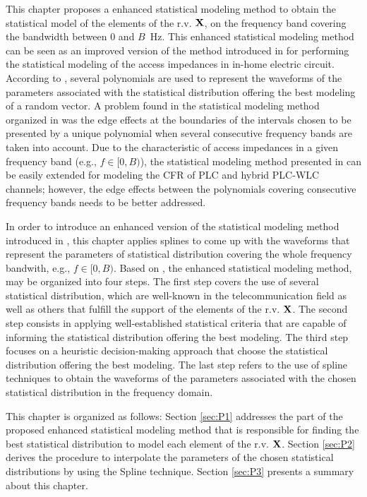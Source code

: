 This chapter proposes a enhanced statistical modeling method to obtain the statistical model of the elements of the \ac{r.v.} $\bf X$, on the frequency band covering the bandwidth between $0$ and $B$~Hz. This enhanced statistical modeling method can be seen as an improved version of the method introduced in \cite{Luis:AI,Luis:doc} for performing the statistical modeling of the access impedances in in-home electric circuit. According to \cite{Luis:AI,Luis:doc}, several polynomials are used to represent the waveforms of the parameters associated with the statistical distribution offering the best modeling of a random vector. A problem found in the statistical modeling method organized in \cite{Luis:AI,Luis:doc} was the edge effects at the boundaries of the intervals chosen to be presented by a unique polynomial when several consecutive frequency bands are taken into account. Due to the characteristic of access impedances in a given frequency band (e.g., $f\in[0,B)$), the statistical modeling method presented in \cite{Luis:AI,Luis:doc} can be easily extended for modeling the \ac{CFR} of \ac{PLC} and hybrid \ac{PLC}-\ac{WLC} channels; however, the edge effects between the polynomials covering consecutive frequency bands needs to be better addressed. 

In order to introduce an enhanced version of the statistical modeling method introduced in \cite{Luis:AI,Luis:doc}, this chapter applies splines to come up with the waveforms that represent the parameters of statistical distribution covering the whole frequency bandwith, e.g., $f\in[0,B)$. Based on \cite{Luis:AI,Luis:doc}, the enhanced statistical modeling method, may be organized into four steps. The first step covers the use of several statistical distribution, which are well-known in the telecommunication field as well as others that fulfill the support of the elements of the \ac{r.v.} $\bf X$. The second step  consists in applying well-established statistical criteria that are capable of informing the statistical distribution offering the best modeling. The third step focuses on a heuristic decision-making approach that choose the statistical distribution offering the best modeling. The last step refers to the use of spline techniques to obtain the waveforms of the parameters associated with the chosen statistical distribution in the frequency domain. 

This chapter is organized as follows: Section \ref{sec:P1} addresses the part of the proposed enhanced statistical modeling method that is responsible for finding the best statistical distribution to model each element of the \ac{r.v.} ${\bf X}$. Section \ref{sec:P2} derives the procedure to interpolate the parameters of the chosen statistical distributions by using the Spline technique. Section \ref{sec:P3} presents a summary about this chapter.

